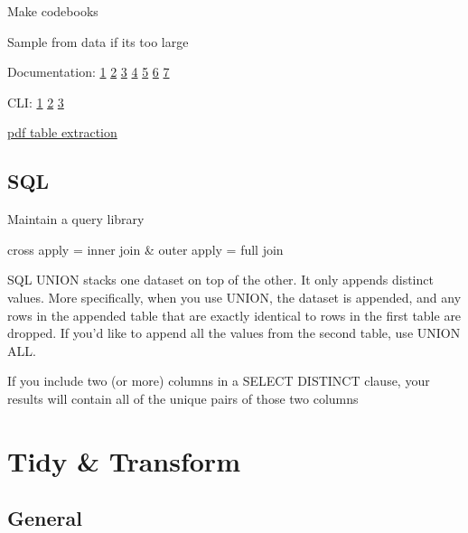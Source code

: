 \documentclass[]{book}
\begin{document}
Make codebooks

Sample from data if its too large

Documentation: \href{http://databasenotetaker.com/}{1} \textbar{} \href{https://dataedo.com/}{2} \textbar{} \href{https://www.apexsql.com/sql-tools-doc.aspx}{3} \textbar{} \href{https://techwriter.me/best-practices-guide/documenting-databases.aspx}{4} \textbar{} \href{http://help.osf.io/m/bestpractices/l/618767-how-to-make-a-data-dictionary}{5} \textbar{} \href{https://dataedo.com/blog/different-types-of-tools-you-can-use-to-document-your-database}{6} \textbar{} \href{https://drawsql.app/\#features}{7}

CLI: \href{http://bconnelly.net/working-with-csvs-on-the-command-line/\#taking-a-peek-at-the-data-set}{1} \textbar{} \href{https://opensource.com/article/17/2/command-line-tools-data-analysis-linux?sc_cid=701600000011jJVAAY}{2} \textbar{} \href{http://alexisperrier.com/shell/2017/11/07/command-line-data-scientist.html}{3}

\href{https://tabula.technology}{pdf table extraction}

\hypertarget{sql}{%
\subsection{SQL}\label{sql}}

Maintain a query library

cross apply = inner join \& outer apply = full join

SQL UNION stacks one dataset on top of the other. It only appends distinct values. More specifically, when you use UNION, the dataset is appended, and any rows in the appended table that are exactly identical to rows in the first table are dropped. If you'd like to append all the values from the second table, use UNION ALL.

If you include two (or more) columns in a SELECT DISTINCT clause, your results will contain all of the unique pairs of those two columns

\hypertarget{tidy-transform}{%
\section{Tidy \& Transform}\label{tidy-transform}}

\hypertarget{general-1}{%
\subsection{General}\label{general-1}}
\end{document}
